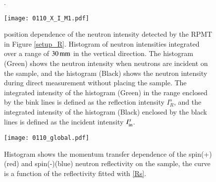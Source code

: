 \documentclass{jps-cp}
\begin{document}
\begin{figure}[tbh].
 \begin{minipage}[t]{0.45\columnwidth}
 \texttt{[image: 0110\_X\_I\_M1.pdf]}
 \centering
 \caption{position dependence of the neutron intensity detected by the RPMT in Figure \ref{setup_R}. Histogram of neutron intensities integrated over a range of $30\,\rm mm$ in the vertical direction. The histogram (Green) shows the neutron intensity when neutrons are incident on the sample, and the histogram (Black) shows the neutron intensity during direct measurement without placing the sample. The integrated intensity of the histogram (Green) in the range enclosed by the bink lines is defined as the reflection intensity $I^s_{ R}$, and the integrated intensity of the histogram (Black) enclosed by the black lines is defined as the incident intensity $I^s_{\rm in}$.}
 \label{mirror_x}
 \end{minipage}
 \hspace{0.1\columnwidth}
 \begin{minipage}[t]{0.45\columnwidth}
  \texttt{[image: 0110\_global.pdf]}
  \centering
  \caption{Histogram shows the momentum transfer dependence of the spin(+)(red) and spin(-)(blue) neutron reflectivity on the sample, the curve is a function of the reflectivity fitted with \ref{Rs}.
  }
  \label{R}
 \end{minipage}
\end{figure}
\end{document}
